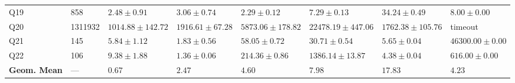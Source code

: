 \begin{tabular}{llllllll}
Q19 & 858 & $2.48 \pm 0.91$ & $3.06 \pm 0.74$ & $\mathbf{2.29 \pm 0.12}$ & $7.29 \pm 0.13$ & $34.24 \pm 0.49$ & $8.00 \pm 0.00$\\
Q20 & 1311932 & $\mathbf{1014.88 \pm 142.72}$ & $1916.61 \pm 67.28$ & $5873.06 \pm 178.82$ & $22478.19 \pm 447.06$ & $1762.38 \pm 105.76$ & timeout\\
Q21 & 145 & $5.84 \pm 1.12$ & $\mathbf{1.83 \pm 0.56}$ & $58.05 \pm 0.72$ & $30.71 \pm 0.54$ & $5.65 \pm 0.04$ & $46300.00 \pm 0.00$\\
Q22 & 106 & $9.38 \pm 1.88$ & $\mathbf{1.36 \pm 0.06}$ & $214.36 \pm 0.86$ & $1386.14 \pm 13.87$ & $4.38 \pm 0.04$ & $616.00 \pm 0.00$\\
\midrule
\textbf{Geom. Mean} & --- & $\mathbf{0.67}$ & $2.47$ & $4.60$ & $7.98$ & $17.83$ & $4.23$\\
\bottomrule
\end{tabular}
